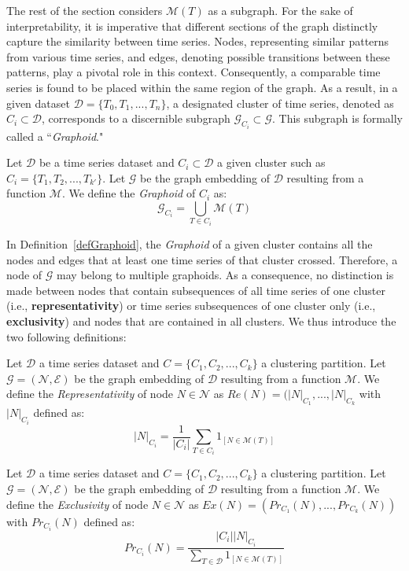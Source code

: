 The rest of the section considers $\mathcal{M}(T)$ as a subgraph.
For the sake of interpretability, it is imperative that different sections of the graph distinctly capture the similarity between time series. Nodes, representing similar patterns from various time series, and edges, denoting possible transitions between these patterns, play a pivotal role in this context. Consequently, a comparable time series is found to be placed within the same region of the graph.
As a result, in a given dataset $\mathcal{D} = \{T_0, T_1, ..., T_n\}$, a designated cluster of time series, denoted as $C_i \subset \mathcal{D}$, corresponds to a discernible subgraph $\mathcal{G}_{C_i} \subset \mathcal{G}$. This subgraph is formally called a ``\textit{Graphoid}."


\begin{definition}[$Graphoid$]   
Let $\mathcal{D}$ be a time series dataset and $C_i \subset \mathcal{D}$ a given cluster such as $C_i = \{T_1,T_2,...,T_{k'}\}$. Let $\mathcal{G}$ be the graph embedding of $\mathcal{D}$ resulting from a function $\mathcal{M}$. We define the {\it Graphoid} of $C_i$ as:
{\small
\[
\mathcal{G}_{C_i} = \bigcup_{T \in C_i} \mathcal{M}(T)
\]
}
\label{defGraphoid}  
\end{definition}

In Definition~\ref{defGraphoid}, the {\it Graphoid} of a given cluster contains all the nodes and edges that at least one time series of that cluster crossed. Therefore, a node of $\mathcal{G}$ may belong to multiple graphoids. As a consequence, no distinction is made between nodes that contain subsequences of all time series of one cluster (i.e., {\bf representativity}) or time series subsequences of one cluster only (i.e., {\bf exclusivity}) and nodes that are contained in all clusters. We thus introduce the two following definitions:

\begin{definition}   
Let $\mathcal{D}$ a time series dataset and $C = \{C_1,C_2,...,C_k\}$ a clustering partition. Let $\mathcal{G}=(\mathcal{N},\mathcal{E})$ be the graph embedding of $\mathcal{D}$ resulting from a function $\mathcal{M}$. We define the {\it Representativity} of node $N \in \mathcal{N}$ as $Re(N) = (|N|_{C_1}, ..., |N|_{C_k}$ with $|N|_{C_i}$ defined as:
{\small
\[
|N|_{C_i} = \frac{1}{{|C_i|}}\sum_{T \in C_i} 1_{[N \in \mathcal{M}(T)]}
\]
}
\label{defnodeRep}  
\end{definition}

\begin{definition}   
Let $\mathcal{D}$ a time series dataset and $C = \{C_1,C_2,...,C_k\}$ a clustering partition. Let $\mathcal{G}=(\mathcal{N},\mathcal{E})$ be the graph embedding of $\mathcal{D}$ resulting from a function $\mathcal{M}$. We define the {\it Exclusivity} of node $N \in \mathcal{N}$ as $Ex(N) = (Pr_{C_1}(N), ..., Pr_{C_k}(N))$ with $Pr_{C_i}(N)$ defined as:
{\small
\[
Pr_{C_i}(N) = \frac{|C_i||N|_{C_i}}{\sum_{T \in \mathcal{D}} 1_{[N \in \mathcal{M}(T)]}}
\]
}
\label{defnodeEx}  
\end{definition}

